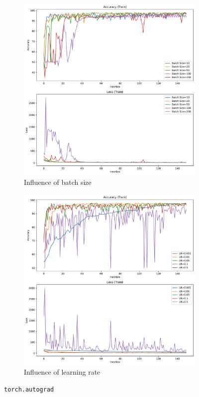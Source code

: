 \begin{figure}[H]\ContinuedFloat
    \centering
    \begin{subfigure}{0.45\textwidth}
        \centering
        \includegraphics[width=\textwidth]{figs/NN/autograd_batchsize.pdf}
        \caption{Influence of batch size}
        \label{subfig:autograd_batchsize}
    \end{subfigure}
    \begin{subfigure}{0.45\textwidth}
        \centering
        \includegraphics[width=\textwidth]{figs/NN/autograd_lr.pdf}
        \caption{Influence of learning rate}
        \label{subfig:autograd_lr}
    \end{subfigure}
    \caption{\texttt{torch.autograd}}
    \label{fig:autograd}
\end{figure}


